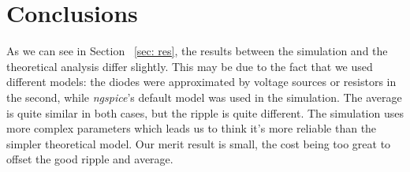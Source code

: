 \section{Conclusions}
As we can see in Section ~\ref{sec: res}, the results between the simulation and the theoretical analysis differ slightly. This may be due to the fact that we used different models: the diodes were approximated by voltage sources or resistors in the second, while \textit{ngspice}'s default model was used in the simulation. The average is quite similar in both cases, but the ripple is quite different. The simulation uses more complex parameters which leads us to think it's more reliable than the simpler theoretical model. Our merit result is small, the cost being too great to offset the good ripple and average.
